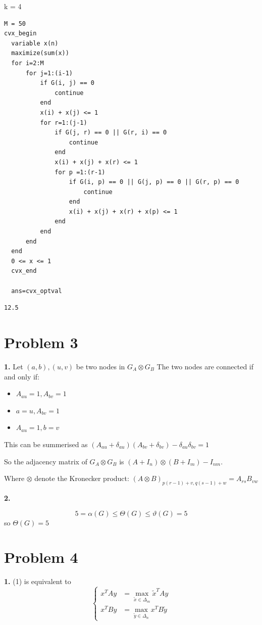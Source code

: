 \documentclass[11pt]{article}
\begin{document}
k = 4
\begin{verbatim}
M = 50
cvx_begin 
  variable x(n)
  maximize(sum(x))
  for i=2:M
      for j=1:(i-1)
          if G(i, j) == 0
              continue
          end
          x(i) + x(j) <= 1
          for r=1:(j-1)
              if G(j, r) == 0 || G(r, i) == 0
                  continue
              end
              x(i) + x(j) + x(r) <= 1
              for p =1:(r-1)
                  if G(i, p) == 0 || G(j, p) == 0 || G(r, p) == 0
                      continue
                  end
                  x(i) + x(j) + x(r) + x(p) <= 1
              end
          end
      end
  end
  0 <= x <= 1
  cvx_end

  ans=cvx_optval
\end{verbatim}

\begin{verbatim}
12.5
\end{verbatim}


\section{Problem 3}
\label{sec:orgheadline5}
\textbf{1.}
Let \((a, b), (u, v)\) be two nodes in \(G_A \otimes G_B\)
The two nodes are connected if and only if:
\begin{itemize}
\item \(A_{au} = 1, A_{bv} = 1\)
\item \(a = u, A_{bv} = 1\)
\item \(A_{au} = 1, b = v\)
\end{itemize}
This can be summerised as \((A_{au} + \delta_{au})(A_{bv} + \delta_{bv}) - \delta_{au}\delta_{bv} = 1\)

So the adjacency matrix of \(G_A \otimes G_B\) is
\((A+I_{n}) \otimes (B+I_m) - I_{nm}\).

Where \(\otimes\) denote the Kronecker product: \((A\otimes B)_{p(r-1)+v, q(s-1)+w} = A_{rs} B_{vw}\)

\textbf{2.}

$$5 = \alpha(G) \le \Theta(G) \le \vartheta(G) = 5$$
so \(\Theta(G) = 5\)



\section{Problem 4}
\label{sec:orgheadline6}

\textbf{1.}
(1) is equivalent to
\[\left\{\begin{array}{cc}
  x^TAy &= \max_{\tilde x \in \Delta_m} \tilde x^TAy\\
  x^TBy &= \max_{\tilde y \in \Delta_n}  x^TB\tilde y
  \end{array}\right.\]
\end{document}
